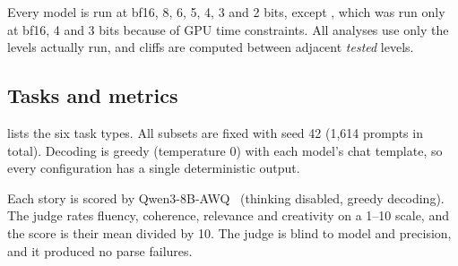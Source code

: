  Every model is run at bf16, 8, 6, 5, 4, 3 and 2 bits, except \phithree, which was run only at bf16, 4 and 3 bits because of GPU time constraints. All analyses use only the levels actually run, and cliffs are computed between adjacent \emph{tested} levels.

\subsection{Tasks and metrics}
 lists the six task types. All subsets are fixed with seed 42 (1,614 prompts in total). Decoding is greedy (temperature 0) with each model's chat template, so every configuration has a single deterministic output.

\begin{table}[t]
\centering
\caption{Task suite. Each task type uses one dataset, a fixed random subset, and a task-appropriate metric. \texttt{max\_tokens} is the generation limit.}
\label{tab:tasks}
\end{table}

 Each story is scored by Qwen3-8B-AWQ~\cite{yang2025qwen3} (thinking disabled, greedy decoding). The judge rates fluency, coherence, relevance and creativity on a 1--10 scale, and the score is their mean divided by 10. The judge is blind to model and precision, and it produced no parse failures.

